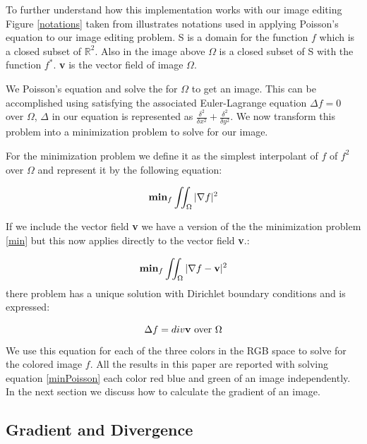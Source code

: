 \documentclass[10pt,twopage]{acmsiggraph}
\begin{document}
To further understand how this implementation works with our image editing Figure \ref{notations} taken from \cite{Perez} illustrates notations used in applying Poisson's equation to our image editing problem. S is a domain  for the function $f$ which is a closed subset of  \ensuremath{\mathbb{R}^2}. Also in the image above \ensuremath{\Omega} is a closed subset of S with the function $f^*$. {\bf v} is the vector field of image  \ensuremath{\Omega}. 

We Poisson's equation and solve the for \ensuremath{\Omega} to get an image. This can be accomplished using satisfying the associated Euler-Lagrange equation \ensuremath{\Delta f = 0} over \ensuremath{\Omega}, \ensuremath{\Delta} in our equation is represented as \ensuremath{\frac{\delta^2}{\delta x^2} + \frac{\delta^2}{\delta y^2}}. We now transform this problem into a minimization problem to solve for our image.

For the minimization problem we define it as the simplest interpolant of $f$ of $f^2$ over \ensuremath{\Omega} and represent it by the following equation:

\begin{equation}
\ensuremath{{\bf min}_f \iint_{\Omega}{|\nabla f|^2}}
\label{min}
\end{equation}

If we include the vector field {\bf v} we have a version of the the minimization problem \ref{min} but this now applies directly to the vector field {\bf v}.:

\begin{equation}
{\bf min}_f \iint_{\Omega}{|\nabla f - {\bf v}|^2}
\label{minPoisson}
\end{equation}
there problem has a unique solution with Dirichlet boundary conditions and is expressed:

\begin{equation}
\Delta f = div {\bf v} \mbox{ over \ensuremath{\Omega}}
\label{poissonEqn}
\end{equation}
We use this equation for each of the three colors in the RGB space to solve for the colored image $f$. All the results in this paper are reported with solving equation \ref{minPoisson} each color red blue and green of an image independently. In the next section we discuss how to calculate the gradient of an image.

\subsection{Gradient and Divergence}
\end{document}

